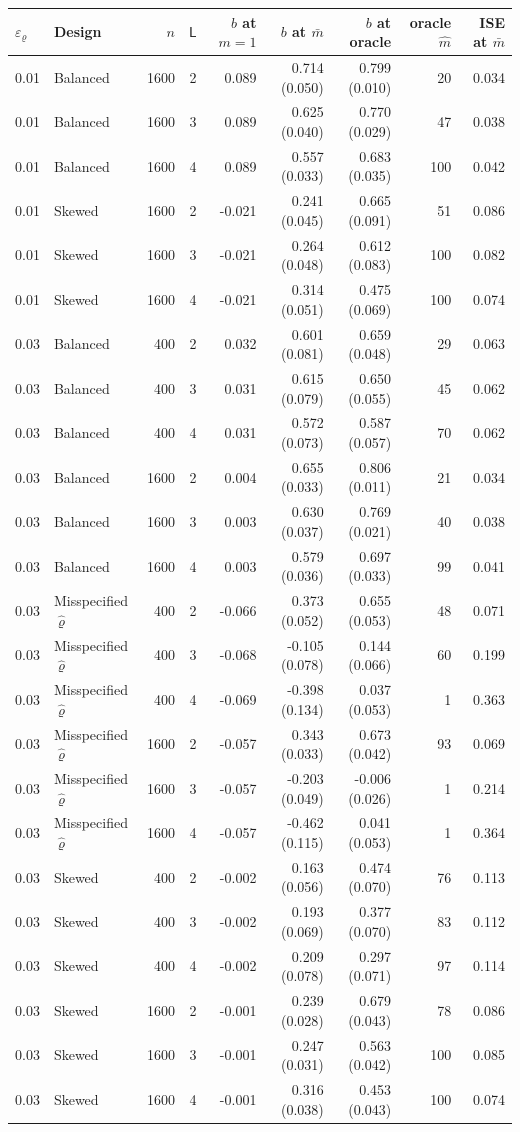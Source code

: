 \begin{tabular}{llrrrrrrr}
\toprule
$\varepsilon_\varrho$ & Design & $n$ & $\mathsf L$ & $b$ at $m=1$ & $b$ at $\bar m$ & $b$ at oracle & oracle $\hat m$ & ISE at $\bar m$ \\
\midrule
0.01 & Balanced & 1600 & 2 & 0.089 & 0.714 (0.050) & 0.799 (0.010) & 20 & 0.034 \\
0.01 & Balanced & 1600 & 3 & 0.089 & 0.625 (0.040) & 0.770 (0.029) & 47 & 0.038 \\
0.01 & Balanced & 1600 & 4 & 0.089 & 0.557 (0.033) & 0.683 (0.035) & 100 & 0.042 \\
0.01 & Skewed & 1600 & 2 & -0.021 & 0.241 (0.045) & 0.665 (0.091) & 51 & 0.086 \\
0.01 & Skewed & 1600 & 3 & -0.021 & 0.264 (0.048) & 0.612 (0.083) & 100 & 0.082 \\
0.01 & Skewed & 1600 & 4 & -0.021 & 0.314 (0.051) & 0.475 (0.069) & 100 & 0.074 \\
0.03 & Balanced & 400 & 2 & 0.032 & 0.601 (0.081) & 0.659 (0.048) & 29 & 0.063 \\
0.03 & Balanced & 400 & 3 & 0.031 & 0.615 (0.079) & 0.650 (0.055) & 45 & 0.062 \\
0.03 & Balanced & 400 & 4 & 0.031 & 0.572 (0.073) & 0.587 (0.057) & 70 & 0.062 \\
0.03 & Balanced & 1600 & 2 & 0.004 & 0.655 (0.033) & 0.806 (0.011) & 21 & 0.034 \\
0.03 & Balanced & 1600 & 3 & 0.003 & 0.630 (0.037) & 0.769 (0.021) & 40 & 0.038 \\
0.03 & Balanced & 1600 & 4 & 0.003 & 0.579 (0.036) & 0.697 (0.033) & 99 & 0.041 \\
0.03 & Misspecified $\hat\varrho$ & 400 & 2 & -0.066 & 0.373 (0.052) & 0.655 (0.053) & 48 & 0.071 \\
0.03 & Misspecified $\hat\varrho$ & 400 & 3 & -0.068 & -0.105 (0.078) & 0.144 (0.066) & 60 & 0.199 \\
0.03 & Misspecified $\hat\varrho$ & 400 & 4 & -0.069 & -0.398 (0.134) & 0.037 (0.053) & 1 & 0.363 \\
0.03 & Misspecified $\hat\varrho$ & 1600 & 2 & -0.057 & 0.343 (0.033) & 0.673 (0.042) & 93 & 0.069 \\
0.03 & Misspecified $\hat\varrho$ & 1600 & 3 & -0.057 & -0.203 (0.049) & -0.006 (0.026) & 1 & 0.214 \\
0.03 & Misspecified $\hat\varrho$ & 1600 & 4 & -0.057 & -0.462 (0.115) & 0.041 (0.053) & 1 & 0.364 \\
0.03 & Skewed & 400 & 2 & -0.002 & 0.163 (0.056) & 0.474 (0.070) & 76 & 0.113 \\
0.03 & Skewed & 400 & 3 & -0.002 & 0.193 (0.069) & 0.377 (0.070) & 83 & 0.112 \\
0.03 & Skewed & 400 & 4 & -0.002 & 0.209 (0.078) & 0.297 (0.071) & 97 & 0.114 \\
0.03 & Skewed & 1600 & 2 & -0.001 & 0.239 (0.028) & 0.679 (0.043) & 78 & 0.086 \\
0.03 & Skewed & 1600 & 3 & -0.001 & 0.247 (0.031) & 0.563 (0.042) & 100 & 0.085 \\
0.03 & Skewed & 1600 & 4 & -0.001 & 0.316 (0.038) & 0.453 (0.043) & 100 & 0.074 \\
\bottomrule
\end{tabular}
